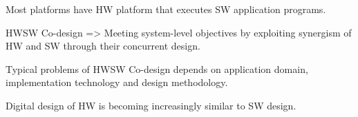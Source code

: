 
Most platforms have HW platform that executes SW application programs. 

HWSW Co-design => Meeting system-level objectives by exploiting synergism of HW and SW through their concurrent design. 

Typical problems of HWSW Co-design depends on application domain, implementation technology and design methodology. 

Digital design of HW is becoming increasingly similar to SW design. 